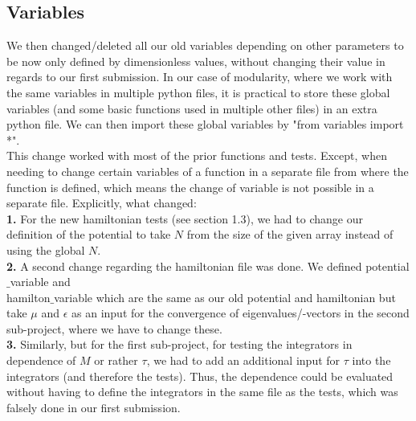 \documentclass[11pt, letterpaper, onecolumn]{article}
\begin{document}
\subsection{Variables}
	We then changed/deleted all our old variables depending on other parameters to be now only defined by dimensionless values, without changing their value in regards to our first submission. In our case of modularity, where we work with the same variables in multiple python files, it is practical to store these global variables (and some basic functions used in multiple other files) in an extra python file. We can then import these global variables by "from variables import *". \\
	This change worked with most of the prior functions and tests. Except, when needing to change certain variables of a function in a separate file from where the function is defined, which means the change of variable is not possible in a separate file. Explicitly, what changed: \\
	\textbf{1.} For the new hamiltonian tests (see section 1.3), we had to change our definition of the potential to take $N$ from the size of the given array instead of using the global $N$.\\
	\textbf{2.} A second change regarding the hamiltonian file was done. We defined potential$\_$variable and \\hamilton$\_$variable which are the same as our old potential and hamiltonian but take $\mu$ and $\epsilon$ as an input for the convergence of eigenvalues/-vectors in the second sub-project, where we have to change these.\\
	\textbf{3.} Similarly, but for the first sub-project, for testing the integrators in dependence of $M$ or rather $\tau$, we had to add an additional input for $\tau$ into the integrators (and therefore the tests). Thus, the dependence could be evaluated without having to define the integrators in the same file as the tests, which was falsely done in our first submission.
\end{document}
